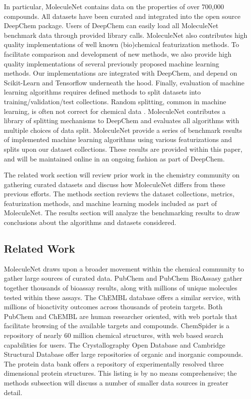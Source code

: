 In particular, MoleculeNet contains data on the properties of over 700,000 compounds. All datasets have been curated and integrated into the open source DeepChem package.\cite{deepchem} Users of DeepChem can easily load all MoleculeNet benchmark data through provided library calls. MoleculeNet also contributes high quality implementations of well known (bio)chemical featurization methods. To facilitate comparison and development of new methods, we also provide high quality implementations of several previously proposed machine learning methods. Our implementations are integrated with DeepChem, and depend on Scikit-Learn \cite{pedregosa2011scikit} and Tensorflow \cite{abadi2016tensorflow} underneath the hood. Finally, evaluation of machine learning algorithms requires defined methods to split datasets into training/validation/test collections. Random splitting, common in machine learning, is often not correct for chemical data \cite{sheridan2013time}. MoleculeNet contributes a library of splitting mechanisms to DeepChem and evaluates all algorithms with multiple choices of data split. MoleculeNet provide a series of benchmark results of implemented machine learning algorithms using various featurizations and splits upon our dataset collections. These results are provided within this paper, and will be maintained online in an ongoing fashion as part of DeepChem. 

The related work section will review prior work in the chemistry community on gathering curated datasets and discuss how MoleculeNet differs from these previous efforts. The methods section reviews the dataset collections, metrics, featurization methods, and machine learning models included as part of MoleculeNet. The results section will analyze the benchmarking results to draw conclusions about the algorithms and datasets considered.

\subsection{Related Work}
MoleculeNet draws upon a broader movement within the chemical community to gather large sources of curated data. PubChem \cite{bolton2008pubchem} and PubChem BioAssasy \cite{pcba_dataset} gather together thousands of bioassay results, along with millions of unique molecules tested within these assays. The ChEMBL database offers a similar service, with millions of bioactivity outcomes across thousands of protein targets. Both PubChem and ChEMBL are human researcher oriented, with web portals that facilitate browsing of the available targets and compounds. ChemSpider is a repository of nearly 60 million chemical structures, with web based search capabilities for users. The Crystallography Open Database \cite{gravzulis2009crystallography} and Cambridge Structural Database \cite{groom2016cambridge} offer large repositories of organic and inorganic compounds. The protein data bank \cite{berman2003announcing} offers a repository of experimentally resolved three dimensional protein structures. This listing is by no means comprehensive; the methods subsection will discuss a number of smaller data sources in greater detail.

